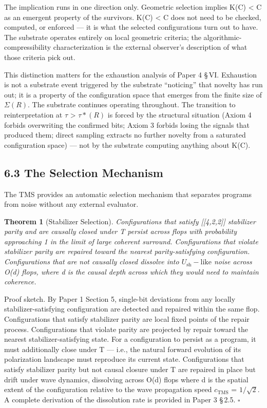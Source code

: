 \documentclass[11pt,oneside]{report}
\newtheorem{theorem}{Theorem}[section]
\theoremstyle{definition}
\theoremstyle{remark}
\begin{document}
The implication runs in one direction only. Geometric selection implies
K(C) \textless{} \textbar C\textbar{} as an emergent property of the
survivors. K(C) \textless{} \textbar C\textbar{} does not need to be
checked, computed, or enforced --- it is what the selected
configurations turn out to have. The substrate operates entirely on
local geometric criteria; the algorithmic-compressibility
characterization is the external observer's description of what those
criteria pick out.

This distinction matters for the exhaustion analysis of Paper 4 \S\,VI.
Exhaustion is not a substrate event triggered by the substrate
``noticing'' that novelty has run out; it is a property of the
configuration space that emerges from the finite size of \ensuremath{\Sigma (R).} The
substrate continues operating throughout. The transition to
reinterpretation at \ensuremath{\tau} \textgreater{} \ensuremath{\tau *(R)} is forced by the structural
situation (Axiom 4 forbids overwriting the confirmed bits; Axiom 3
forbids losing the signals that produced them; direct sampling extracts
no further novelty from a saturated configuration space) --- not by the
substrate computing anything about K(C).

\subsection*{6.3 The Selection Mechanism}

The TMS provides an automatic selection mechanism that separates
programs from noise without any external evaluator.

\begin{theorem}[Stabilizer Selection]
Configurations that satisfy
[[4,2,2]] stabilizer parity and are causally closed under T
persist across flops with probability approaching 1 in the limit of
large coherent surround. Configurations that violate stabilizer parity
are repaired toward the nearest parity-satisfying configuration.
Configurations that are not causally closed dissolve into \ensuremath{U_{\mathrm{sh}}-\text{like}} noise
across O(d) flops, where d is the causal depth across which they would
need to maintain coherence.
\end{theorem}

Proof sketch. By Paper 1 Section 5, single-bit deviations from any
locally stabilizer-satisfying configuration are detected and repaired
within the same flop. Configurations that satisfy stabilizer parity are
local fixed points of the repair process. Configurations that violate
parity are projected by repair toward the nearest stabilizer-satisfying
state. For a configuration to persist as a program, it must additionally
close under T --- i.e., the natural forward evolution of its
polarization landscape must reproduce its current state. Configurations
that satisfy stabilizer parity but not causal closure under T are
repaired in place but drift under wave dynamics, dissolving across O(d)
flops where d is the spatial extent of the configuration relative to the
wave propagation speed \ensuremath{c_{\mathrm{TMS}}} = \ensuremath{1/\sqrt{2}.} A complete derivation of the
dissolution rate is provided in Paper 3 \S\,2.5. \hfill\ensuremath{\square}
\end{document}
